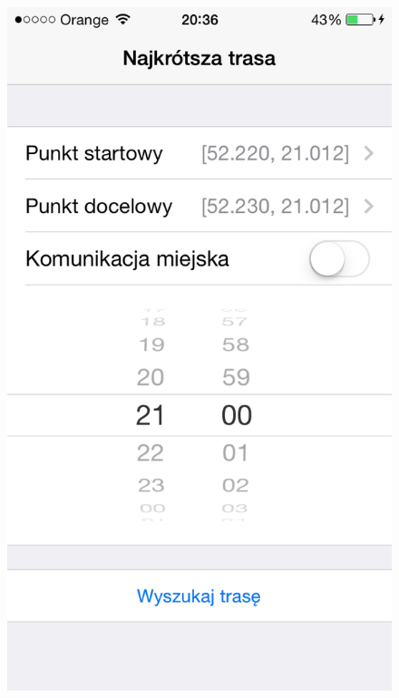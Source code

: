 \documentclass[a4paper,12pt]{article}
\begin{document}
	\begin{figure}[ht!]
		\centering
		\begin{minipage}{.45\textwidth}
			\centering
  			\includegraphics[width=\linewidth, height=.4\textheight,keepaspectratio]{graphics/snapshots/main_screen.png}
  			\label{fig:main_screen}
		\end{minipage} \hfill
		\begin{minipage}{.45\textwidth}
			\centering

\end{minipage}
\end{figure}
\end{document}
